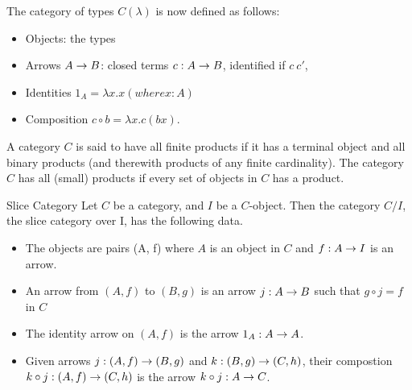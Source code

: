 The category of types $ C(\lambda ) $ is now defined as follows:
\begin{itemize}
\item Objects: the types
\item Arrows $A \rightarrow B$: closed terms $c: A \rightarrow B$, identified if $c ~ c'$,
\item Identities $1_A = \lambda x.x (where x : A) $
\item Composition $c \circ b = \lambda x.c(bx)$.
\end{itemize}

\begin{definition}
  A category $C$ is said to have all finite products if it has a terminal object
  and all binary products (and therewith products of any finite cardinality). The
  category $C$ has all (small) products if every set of objects in $C$ has a product.
\end{definition}

\begin{definition}{Slice Category}
  Let $C$ be a category, and $I$ be a $C$-object. Then the category $C / I$, the slice
  category over I, has the following data.
  \begin{itemize}
  \item The objects are pairs (A, f) where $A$ is an object in $C$ and $f: A \rightarrow I$ is
    an arrow.
  \item An arrow from $(A, f)$ to $(B, g)$ is an arrow $j: A \rightarrow B$ such that $g \circ j = f$ in $C$
  \item The identity arrow on $(A, f)$ is the arrow $1_A : A \rightarrow A$.
  \item Given arrows $j: (A, f) \rightarrow (B, g)$ and $ k: (B, g) \rightarrow (C, h) $, their compostion
    $k \circ j: (A, f) \rightarrow (C, h)$ is the arrow $k \circ j : A \rightarrow C$.
  \end{itemize}
\end{definition}